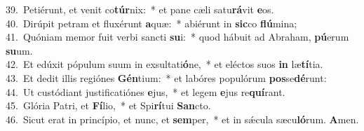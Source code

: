 {39.~}Petiérunt, et venit co\textbf{túr}nix:~* et pane cæli satu\textbf{rá}vit \textbf{e}os.\\
{40.~}Dirúpit petram et fluxérunt \textbf{a}quæ:~* abiérunt in \textbf{sic}co \textbf{flú}mina;\\
{41.~}Quóniam memor fuit verbi sancti \textbf{su}i:~* quod hábuit ad Abraham, \textbf{pú}erum \textbf{su}um.\\
{42.~}Et edúxit pópulum suum in exsultati\textbf{ó}ne,~* et eléctos suos \textbf{in} læ\textbf{tí}tia.\\
{43.~}Et dedit illis regiónes \textbf{Gén}tium:~* et labóres populórum \textbf{pos}se\textbf{dé}runt:\\
{44.~}Ut custódiant justificatiónes \textbf{e}jus,~* et legem \textbf{e}jus re\textbf{quí}rant.\\
{45.~}Glória Patri, et \textbf{Fí}lio,~* et Spi\textbf{rí}tui \textbf{San}cto.\\
{46.~}Sicut erat in princípio, et nunc, et \textbf{sem}per,~* et in sǽcula sæcu\textbf{ló}rum. \textbf{A}men.\\
